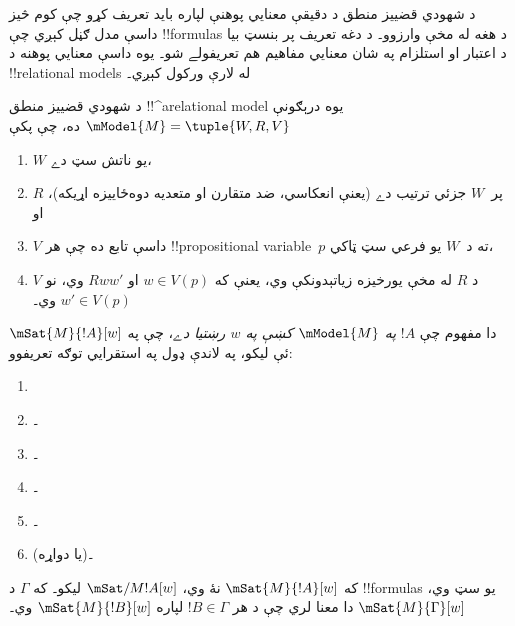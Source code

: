 \documentclass[../../../include/open-logic-section]{subfiles}
\begin{document}


د شهودي قضييز منطق د دقيقې معنايي پوهنې لپاره بايد تعريف کړو چې
کوم څيز داسې مدل ګڼل کېږي چې !!{formula}s د هغه له مخې وارزوو۔
د دغه تعريف پر بنسټ بيا د اعتبار او استلزام په شان معنايي مفاهيم
هم تعريفولے شو۔ يوه داسې معنايي پوهنه د !!{relational model}s له
لارې ورکول کېږي۔

\begin{defn}
  د شهودي قضييز منطق !!^a{relational model} يوه درېګونې
  $\mModel{M} = \tuple{W, R, V}$ ده، چې پکې
  \begin{enumerate}
  \item $W$ يو ناتش سټ دے،
  \item $R$ پر~$W$ جزئي ترتيب دے (يعنې انعکاسي، ضد متقارن او
    متعديه دوه‌ځاييزه اړيکه)، او
  \item $V$ داسې تابع ده چې هر !!{propositional
    variable}~$p$ ته د~$W$ يو فرعي سټ ټاکي،
  \item $V$ د $R$ له مخې يورخيزه زياتېدونکې وي، يعنې که $w
    \in V(p)$ او $Rww'$ وي، نو $w' \in V(p)$ وي۔
  \end{enumerate}
\end{defn}

\begin{defn}
  دا مفهوم چې $!A$ \emph{په $\mModel{M}$ کښې په $w$ رښتيا دے}،
  چې په $\mSat{M}{!A}[w]$ ئې ليکو، په لاندې ډول په استقرايي توګه
  تعريفوو:
  \begin{enumerate}
  \item {}
  \item {}۔
  \item {}۔
  \item {}۔
  \item {}۔
  \item {} (يا دواړه)۔
  \end{enumerate}
  که $\mSat{M}{!A}[w]$ نۀ وي، $\mSat/{M}{!A}[w]$ ليکو۔ که
  $\Gamma$ د !!{formula}s يو سټ وي، $\mSat{M}{\Gamma}[w]$ دا معنا
  لري چې د هر $!B \in \Gamma$ لپاره $\mSat{M}{!B}[w]$ وي۔
\end{defn}
\end{document}
